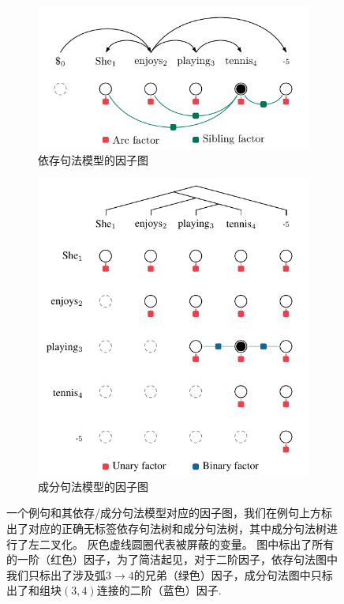 \begin{figure}[tb!]
	\centering
	\begin{subfigure}[b]{0.8\textwidth}
		\centering
		\includegraphics[scale=1]{figures/dep-factors.pdf}
		\caption{依存句法模型的因子图}
		\label{fig:dep-factors}
	\end{subfigure}
	\begin{subfigure}[b]{0.8\textwidth}
		\centering
		\includegraphics[scale=1]{figures/con-factors.pdf}
		\caption{成分句法模型的因子图}
		\label{fig:con-factors}
	\end{subfigure}
	\caption{一个例句和其依存/成分句法模型对应的因子图，我们在例句上方标出了对应的正确无标签依存句法树和成分句法树，其中成分句法树进行了左二叉化。
		灰色虚线圆圈代表被屏蔽的变量。
		图中标出了所有的一阶（红色）因子，为了简洁起见，对于二阶因子，依存句法图中我们只标出了涉及弧$3\rightarrow 4$的兄弟（绿色）因子，成分句法图中只标出了和组块$(3, 4)$连接的二阶（蓝色）因子.}
	\label{fig:vi-factors}
\end{figure}

